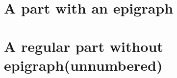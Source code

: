 \documentclass[11pt, a4paper, makeidx]{memoir}
\newcommand{\epipart}[3]{
\let\oldafterpartskip\afterpartskip
\renewcommand{\afterpartskip}{%
\vspace{1em}
\epigraph{#2}{#3}
\vfill
}
\part*{#1}
\let\afterpartskip\oldafterpartskip
}
\begin{document}

\frontmatter


\mainmatter

\pagestyle{companion}

\epipart{A part with an epigraph}{"A fancy quote"}{Some pretentious author}

\part*{A regular part without epigraph(unnumbered)}
 


{\small}

\appendix
\appendixpage*


\backmatter

\end{document}

